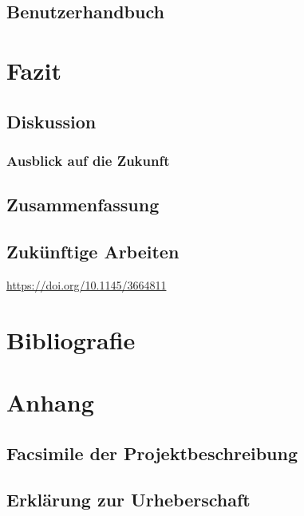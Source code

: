 \documentclass[a4paper,12pt]{report}
\begin{document}
    \clearpage


    \section{Benutzerhandbuch}
    \label{sec:user-manual}


    \chapter{Fazit}


    \section{Diskussion}

    \subsection{Ausblick auf die Zukunft}


    \section{Zusammenfassung}


    \section{Zukünftige Arbeiten}\label{sec:zukunftigearbeiten}
    \url{https://doi.org/10.1145/3664811}

    \printglossary

    \clearpage
    \printindex

    \clearpage


    \chapter{Bibliografie}

    \appendix


    \chapter{Anhang}
    \clearpage
    
    


    \section{Facsimile der Projektbeschreibung}


    \section{Erklärung zur Urheberschaft}
\end{document}
